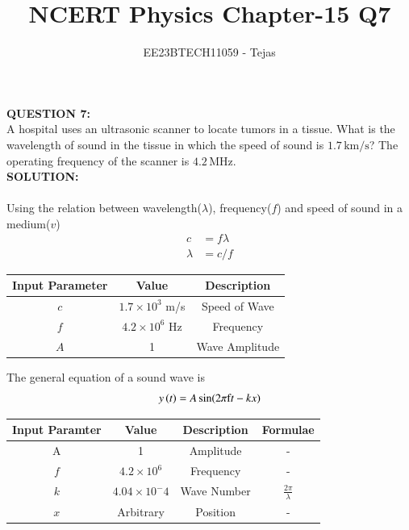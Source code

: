\documentclass[journal,12pt,twocolumn]{IEEEtran}
\theoremstyle{remark}
\begin{document}


\vspace{3cm}

\title{NCERT Physics Chapter-15 Q7}
\author{EE23BTECH11059 - Tejas$^{}$}
\maketitle

\newpage

\Huge \textbf{QUESTION 7:} \\

\medskip
\Large
A hospital uses an ultrasonic scanner to locate tumors in a tissue. What is the
wavelength of sound in the tissue in which the speed of sound is $1.7 \, \text{km/s}$? The operating frequency of the scanner is $4.2 \, \text{MHz}$.
\bigskip
\\
\Large
\textbf{SOLUTION:} \\

\\
Using the relation between wavelength($\lambda$), frequency($f$) and speed of sound in a medium($v$)\\
\begin{align}
    c&=f\lambda \\
     \lambda&=c/f
\end{align}
\begin{table}[h]
    \centering  
    \begin{tabular}{|c|c|c|}
        \hline
        Input Parameter & Value & Description  \\
        \hline
        $c$ & $1.7\times10^3$ m/s & Speed of Wave   \\
        \hline
        $f$ & $4.2\times10^6$ Hz & Frequency   \\
        \hline
        $A$ & 1 & Wave Amplitude  \\
        \hline
        
        
    \end{tabular}
\end{table}
The general equation of a sound wave is
\begin{align}
y\left(t\right)=A \sin (2\pi\text{f} t-kx)
\end{align}
\begin{table}[h]
    \centering
    \begin{tabular}{|c|c|c|c|}
        \hline
        Input Paramter & Value & Description & Formulae  \\
        \hline
        A& 1&Amplitude& - \\
        \hline
        $f$& $4.2\times10^6$& Frequency& - \\
        \hline
        $k$& $4.04\times10^-4$ & Wave Number & $\frac{2\pi}{\lambda}$ \\
        \hline
        $x$ & Arbitrary & Position & - \\
        \hline
    \end{tabular}
    \
\end{table}
\end{document}
